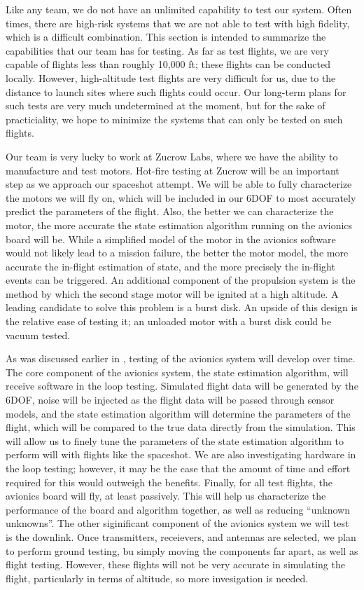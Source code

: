 Like any team, we do not have an unlimited capability to test our system. Often times, there are high-risk systems that we are not able to test with high fidelity, which is a difficult combination. This section is intended to summarize the capabilities that our team has for testing. As far as test flights, we are very capable of flights less than roughly 10,000 ft; these flights can be conducted locally. However, high-altitude test flights are very difficult for us, due to the distance to launch sites where such flights could occur. Our long-term plans for such tests are very much undetermined at the moment, but for the sake of practiciality, we hope to minimize the systems that can only be tested on such flights.

Our team is very lucky to work at Zucrow Labs, where we have the ability to manufacture and test motors. Hot-fire testing at Zucrow will be an important step as we approach our spaceshot attempt. We will be able to fully characterize the motors we will fly on, which will be included in our 6DOF to most accurately predict the parameters of the flight. Also, the better we can characterize the motor, the more accurate the state estimation algorithm running on the avionics board will be. While a simplified model of the motor in the avionics software would not likely lead to a mission failure, the better the motor model, the more accurate the in-flight estimation of state, and the more precisely the in-flight events can be triggered. An additional component of the propulsion system is the method by which the second stage motor will be ignited at a high altitude. A leading candidate to solve this problem is a burst disk. An upside of this design is the relative ease of testing it; an unloaded motor with a burst disk could be vacuum tested.

As was discussed earlier in , testing of the avionics system will develop over time. The core component of the avionics system, the state estimation algorithm, will receive software in the loop testing. Simulated flight data will be generated by the 6DOF, noise will be injected as the flight data will be passed through sensor models, and the state estimation algorithm will determine the parameters of the flight, which will be compared to the true data directly from the simulation. This will allow us to finely tune the parameters of the state estimation algorithm to perform will with flights like the spaceshot. We are also investigating hardware in the loop testing; however, it may be the case that the amount of time and effort required for this would outweigh the benefits. Finally, for all test flights, the avionics board will fly, at least passively. This will help us characterize the performance of the board and algorithm together, as well as reducing ``unknown unknowns''. The other siginificant component of the avionics system we will test is the downlink. Once transmitters, receievers, and antennas are selected, we plan to perform ground testing, bu simply moving the components far apart, as well as flight testing. However, these flights will not be very accurate in simulating the flight, particularly in terms of altitude, so more invesigation is needed.

